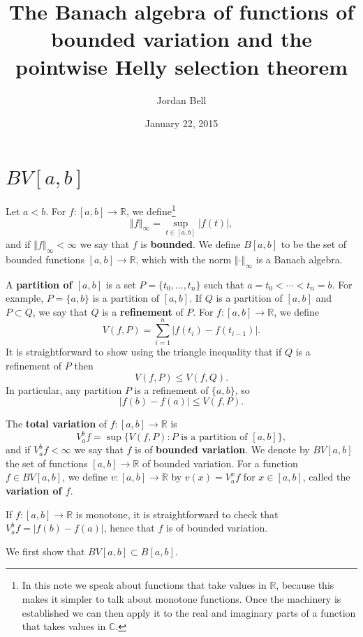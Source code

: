 \documentclass{article}
\newcommand{\norm}[1]{\left\Vert #1 \right\Vert}
\theoremstyle{definition}
\begin{document}
\title{The Banach algebra of functions of bounded variation and the pointwise Helly selection theorem}
\author{Jordan Bell}
\date{January 22, 2015}

\maketitle

\section{$BV[a,b]$}
Let $a<b$. For $f:[a,b] \to \mathbb{R}$, we define\footnote{In this note we speak about functions that take values in $\mathbb{R}$, because
this makes it simpler to talk about monotone functions. Once the machinery is established we can
then apply it to the real and imaginary parts of a function that takes values in $\mathbb{C}$.}
\[
\norm{f}_\infty = \sup_{t \in [a,b]} |f(t)|,
\]
and if $\norm{f}_\infty<\infty$ we say that $f$ is \textbf{bounded}. We define
$B[a,b]$ to be the set of bounded functions $[a,b] \to \mathbb{R}$, which with the norm $\norm{\cdot}_\infty$ is a Banach algebra.



A \textbf{partition of $[a,b]$} is a set
$P=\{t_0,\ldots,t_n\}$ such that $a=t_0<\cdots<t_n=b$. For example, $P=\{a,b\}$ is a partition of $[a,b]$.
If $Q$ is a partition of $[a,b]$ and $P \subset Q$, we say that $Q$ is a \textbf{refinement} of $P$.
For $f:[a,b] \to \mathbb{R}$,
 we define
\[
V(f,P) = \sum_{i=1}^n |f(t_i)-f(t_{i-1})|.
\]
It is straightforward to show using the triangle inequality that if $Q$ is a refinement of $P$ then
\[
V(f,P) \leq V(f,Q).
\]
In particular, any partition $P$ is a refinement of $\{a,b\}$, so
\[
|f(b)-f(a)| \leq V(f,P).
\]


The \textbf{total variation} of $f:[a,b] \to \mathbb{R}$ is 
\[
V_a^b f = \sup \{V(f,P): \textrm{$P$ is a partition of $[a,b]$}\},
\]
and if $V_a^b f <\infty$ we say that $f$ is of \textbf{bounded variation}. We denote by $BV[a,b]$ the set of functions $[a,b] \to \mathbb{R}$ of bounded
variation. 
For a function $f \in BV[a,b]$, we define 
$v:[a,b] \to \mathbb{R}$ by $v(x)=V_a^x f$ for $x \in [a,b]$, called
the \textbf{variation of $f$}.

If $f:[a,b] \to \mathbb{R}$ is monotone, it is straightforward to check that
$V_a^b f =|f(b)-f(a)|$,
 hence that $f$
is of bounded variation.


We first show that $BV[a,b] \subset B[a,b]$.
\end{document}

